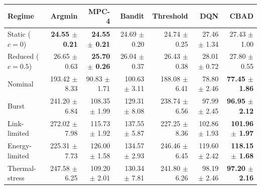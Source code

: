 \begin{tabular}{lrrrrrr}
\toprule
Regime & Argmin & MPC-4 & Bandit & Threshold & DQN & CBAD \\
\midrule
Static ($c=0$) & \textbf{24.55 $\pm$ 0.21} & \textbf{24.55 $\pm$ 0.21} & 24.69 $\pm$ 0.20 & 24.74 $\pm$ 0.25 & 27.46 $\pm$ 1.34 & 27.43 $\pm$ 1.00 \\
Reduced ($c=0.5$) & 26.65 $\pm$ 0.63 & \textbf{25.70 $\pm$ 0.26} & 26.04 $\pm$ 0.37 & 26.43 $\pm$ 0.38 & 28.01 $\pm$ 0.72 & 27.80 $\pm$ 0.55 \\
Nominal & 193.42 $\pm$ 8.33 & 90.83 $\pm$ 1.71 & 100.63 $\pm$ 3.11 & 188.08 $\pm$ 6.41 & 78.80 $\pm$ 2.46 & \textbf{77.45 $\pm$ 1.86} \\
Burst & 241.20 $\pm$ 6.84 & 108.35 $\pm$ 1.99 & 129.31 $\pm$ 8.08 & 238.74 $\pm$ 6.56 & 97.99 $\pm$ 2.45 & \textbf{96.95 $\pm$ 2.12} \\
Link-limited & 272.02 $\pm$ 7.98 & 115.73 $\pm$ 1.92 & 137.55 $\pm$ 5.87 & 227.25 $\pm$ 8.36 & 102.86 $\pm$ 1.93 & \textbf{101.96 $\pm$ 1.97} \\
Energy-limited & 225.31 $\pm$ 7.73 & 126.00 $\pm$ 1.58 & 134.57 $\pm$ 2.93 & 246.46 $\pm$ 6.45 & 119.60 $\pm$ 2.42 & \textbf{118.15 $\pm$ 1.68} \\
Thermal-stress & 247.58 $\pm$ 6.25 & 109.20 $\pm$ 2.01 & 130.34 $\pm$ 7.81 & 241.80 $\pm$ 6.26 & 98.19 $\pm$ 2.46 & \textbf{97.20 $\pm$ 2.16} \\
\bottomrule
\end{tabular}